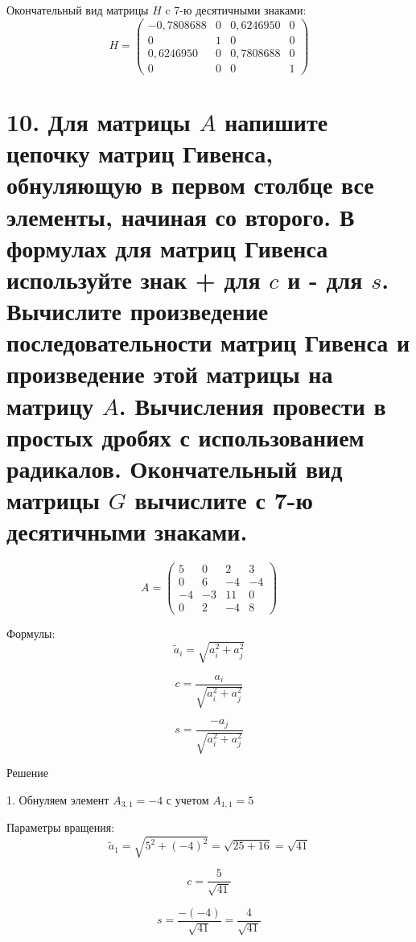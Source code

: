 \documentclass[a4paper,14pt]{article}
\begin{document}
Окончательный вид матрицы $H$ c 7-ю десятичными знаками:
$$
H = \begin{pmatrix}
        -0,7808688 & 0 & 0,6246950 & 0 \\
        0          & 1 & 0         & 0 \\
        0,6246950  & 0 & 0,7808688 & 0 \\
        0          & 0 & 0         & 1
    \end{pmatrix}
$$

\section{10. Для матрицы $A$ напишите цепочку матриц Гивенса, обнуляющую в первом столбце все элементы, начиная со второго. В формулах для матриц Гивенса используйте знак + для $c$ и - для $s$. Вычислите произведение последовательности матриц Гивенса и произведение этой матрицы на матрицу $A$. Вычисления провести в простых дробях с использованием радикалов. Окончательный вид матрицы $G$ вычислите с 7-ю десятичными знаками.}
$$
A = \begin{pmatrix}
5 & 0 & 2 & 3 \\
0 & 6 & -4 & -4 \\
-4 & -3 & 11 & 0 \\
0 & 2 & -4 & 8
\end{pmatrix}
$$

Формулы:
$$
\tilde{a}_i = \sqrt{a^2_i + a^2_j}
$$

$$
c = \frac{a_i}{\sqrt{a^2_i + a^2_j}}
$$

$$
s = \frac{-a_j}{\sqrt{a^2_i + a^2_j}}
$$

Решение

1. Обнуляем элемент $A_{3,1} = -4$ с учетом $A_{1,1} = 5$

Параметры вращения:
$$
\tilde{a}_1 = \sqrt{5^2 + (-4)^2} = \sqrt{25 + 16} = \sqrt{41}
$$

$$
c = \frac{5}{\sqrt{41}}
$$

$$
s = \frac{-(-4)}{\sqrt{41}} = \frac{4}{\sqrt{41}}
$$
\end{document}
